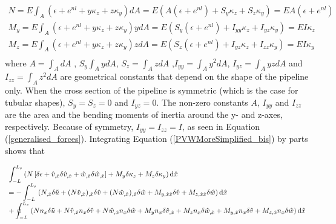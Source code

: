 \documentclass[3p,doublespacing,authoryear,11pt]{elsarticle} %
\begin{document}
  \begin{equation}\label{generalised_forces}
\begin{array}{l }
\displaystyle  N = E\int_{A}  \left(\epsilon + e^{nl} + y \kappa_z + z \kappa_y \right) dA = E \left( A (\epsilon + e^{nl} )  + S_y \kappa_z + S_z \kappa_y \right) = E A (\epsilon + e^{nl} )   \\ 
\displaystyle M_y =E \int_{A}   \left(\epsilon + e^{nl} + y \kappa_z + z \kappa_y \right) y   dA = E \left(S_y (\epsilon + e^{nl} ) + I_{yy} \kappa_z + I_{yz} \kappa_y \right) = EI \kappa_z  \\ 
\displaystyle M_z = E\int_{A}   \left(\epsilon + e^{nl} + y \kappa_z + z \kappa_y \right) z  dA =  E \left(S_z (\epsilon + e^{nl} ) + I_{yz} \kappa_z + I_{zz} \kappa_y \right) = EI \kappa_y \\ 
  \end{array}  
\end{equation}
where $A =\displaystyle \int_{A} dA$  , $S_y \displaystyle \int_{A} y dA$,  $S_z = \displaystyle \int_{A} z dA$ ,$I_{yy} =\displaystyle \int_{A} y^2 dA$, $I_{yz} =\displaystyle \int_{A} yz dA$  and $I_{zz} = \displaystyle \int_{A} z^2dA$ are geometrical constants that depend on the shape of the pipeline only. When the cross section of the pipeline is symmetric (which is the case for tubular shapes), $S_y= S_z = 0$ and $I_{yz} = 0$. The non-zero constants $A$, $I_{yy}$ and $I_{zz}$ are the area and the bending moments of inertia around the y- and z-axes, respectively. Because of symmetry, $I_{yy}=I_{zz} = I$, as seen in Equation (\ref{generalised_forces}). Integrating Equation (\ref{PVWMoreSimplified_bis}) by parts shows that

  \begin{equation}\label{PVWMoreSimplified_sec}
  \begin{array}{l} 
\displaystyle \int_{-L}^{L_s} \left( N \left[ \delta \epsilon + \hat{v}_{,\hat{x}}  \delta \hat{v}_{,\hat{x}}  + \hat{w}_{,\hat{x}}  \delta \hat{w}_{,\hat{x}}   \right]+ M_y \delta \kappa_z + M_z \delta \kappa_y \right) \textup{d}\hat{x} \\
\displaystyle  = - \int_{-L}^{L_s} \left( N_{,\hat{x}} \delta  \tilde{u} + (N \hat{v}_{,\hat{x}})_{,\hat{x}}  \delta \hat{v}  + (N \hat{w}_{,\hat{x}})_{,\hat{x}}  \delta \hat{w}   + M_{y,\hat{x}\hat{x}} \delta \hat{v} + M_{z,\hat{x}\hat{x}} \delta \hat{w} \right) \textup{d}\hat{x} \\
\displaystyle  + \oint_{-L}^{L_s} \left( N n_x \delta  \tilde{u} + N \hat{v}_{,\hat{x}} n_x  \delta \hat{v}  + N \hat{w}_{,\hat{x}} n_x  \delta \hat{w}   + M_y n_x \delta \hat{v}_{,\hat{x}} + M_z n_x \delta \hat{w}_{,\hat{x}}  + M_{y,\hat{x}} n_x \delta \hat{v} + M_{z,\hat{x}} n_x \delta \hat{w}\right) \textup{d}\hat{x}
  \end{array}   
 \end{equation}
 
\end{document}
